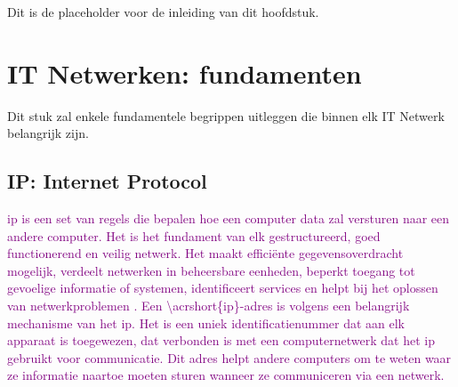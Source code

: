 Dit is de placeholder voor de inleiding van dit hoofdstuk.

\section{IT Netwerken: fundamenten}
Dit stuk zal enkele fundamentele begrippen uitleggen die binnen elk IT Netwerk belangrijk zijn.

\subsection{IP: Internet Protocol}
\textcolor{purple}{\acrfull{ip} is een set van regels die bepalen hoe een computer data zal versturen naar een andere computer. Het is het fundament van elk gestructureerd, goed functionerend en veilig netwerk. Het maakt efficiënte gegevensoverdracht mogelijk, verdeelt netwerken in beheersbare eenheden, beperkt toegang tot gevoelige informatie of systemen, identificeert services en helpt bij het oplossen van netwerkproblemen \autocite{Postel1981}. Een \acrshort{\acrshort{ip}}-adres is volgens \textcite{Postel1981} een belangrijk mechanisme van het \acrshort{ip}. Het is een uniek identificatienummer dat aan elk apparaat is toegewezen, dat verbonden is met een computernetwerk dat het \acrshort{ip} gebruikt voor communicatie. Dit adres helpt andere computers om te weten waar ze informatie naartoe moeten sturen wanneer ze communiceren via een netwerk.}
